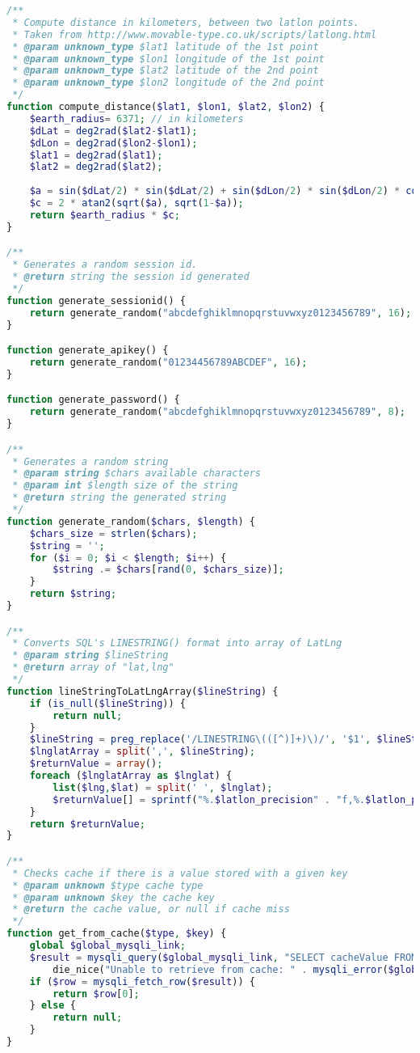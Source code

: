 \begin{lstlisting}[language=PHP,basicstyle=\tiny,caption=utils.php,label={lst:utils.php}]
/**
 * Compute distance in kilometers, between two latlon points.
 * Taken from http://www.movable-type.co.uk/scripts/latlong.html
 * @param unknown_type $lat1 latitude of the 1st point
 * @param unknown_type $lon1 longitude of the 1st point
 * @param unknown_type $lat2 latitude of the 2nd point
 * @param unknown_type $lon2 longitude of the 2nd point
 */
function compute_distance($lat1, $lon1, $lat2, $lon2) {
	$earth_radius= 6371; // in kilometers
	$dLat = deg2rad($lat2-$lat1);
	$dLon = deg2rad($lon2-$lon1);
	$lat1 = deg2rad($lat1);
	$lat2 = deg2rad($lat2);
	
	$a = sin($dLat/2) * sin($dLat/2) + sin($dLon/2) * sin($dLon/2) * cos($lat1) * cos($lat2);
	$c = 2 * atan2(sqrt($a), sqrt(1-$a));
	return $earth_radius * $c;
}

/**
 * Generates a random session id.
 * @return string the session id generated
 */
function generate_sessionid() {
	return generate_random("abcdefghiklmnopqrstuvwxyz0123456789", 16);
}

function generate_apikey() {
	return generate_random("01234456789ABCDEF", 16);
}

function generate_password() {
	return generate_random("abcdefghiklmnopqrstuvwxyz0123456789", 8);
}

/**
 * Generates a random string
 * @param string $chars available characters
 * @param int $length size of the string
 * @return string the generated string
 */
function generate_random($chars, $length) {
	$chars_size = strlen($chars);
	$string = '';
	for ($i = 0; $i < $length; $i++) {
		$string .= $chars[rand(0, $chars_size)];
	}
	return $string;
}

/**
 * Converts SQL's LINESTRING() format into array of LatLng
 * @param string $lineString
 * @return array of "lat,lng"
 */
function lineStringToLatLngArray($lineString) {
	if (is_null($lineString)) {
		return null;
	}
	$lineString = preg_replace('/LINESTRING\(([^)]+)\)/', '$1', $lineString);
	$lnglatArray = split(',', $lineString);
	$returnValue = array();
	foreach ($lnglatArray as $lnglat) {
		list($lng,$lat) = split(' ', $lnglat);
		$returnValue[] = sprintf("%.$latlon_precision" . "f,%.$latlon_precision" . "f", $lat, $lng);
	}
	return $returnValue;
}

/**
 * Checks cache if there is a value stored with a given key
 * @param unknown $type cache type
 * @param unknown $key the cache key
 * @return the cache value, or null if cache miss
 */
function get_from_cache($type, $key) {
	global $global_mysqli_link;
	$result = mysqli_query($global_mysqli_link, "SELECT cacheValue FROM cache WHERE type='$type' AND cacheKey='$key'") or
		die_nice("Unable to retrieve from cache: " . mysqli_error($global_mysqli_link));
	if ($row = mysqli_fetch_row($result)) {
		return $row[0];
	} else {
		return null;
	}
}


\end{lstlisting}
